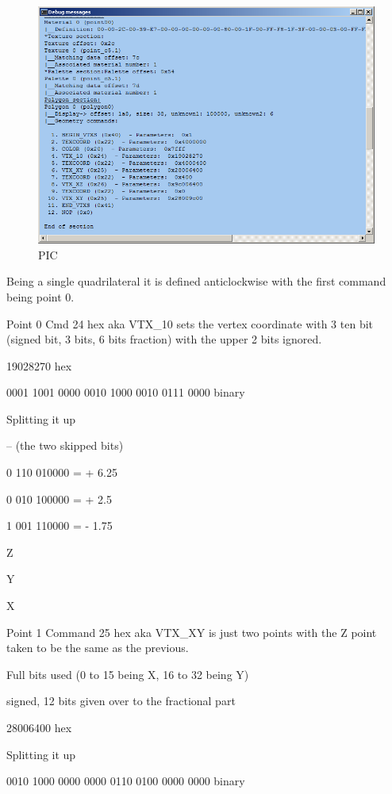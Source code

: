 \documentclass[
]{book}
\begin{document}
\begin{figure}
\centering
\includegraphics{images/63_home_fast6191_romhackingguide_unrenamed_file____romhackingguidegraphics3dminorNSMBDmodel_1.png}
\caption{PIC}
\end{figure}

Being a single quadrilateral it is defined anticlockwise with the first command being point 0.

Point 0 Cmd 24 hex aka VTX\_10 sets the vertex coordinate with 3 ten bit (signed bit, 3 bits, 6 bits fraction) with the upper 2 bits ignored.

19028270 hex

0001 1001 0000 0010 1000 0010 0111 0000 binary

Splitting it up

-- (the two skipped bits)

0 110 010000 = + 6.25

0 010 100000 = + 2.5

1 001 110000 = - 1.75

Z

Y

X

Point 1 Command 25 hex aka VTX\_XY is just two points with the Z point taken to be the same as the previous.

Full bits used (0 to 15 being X, 16 to 32 being Y)

signed, 12 bits given over to the fractional part

28006400 hex

Splitting it up

0010 1000 0000 0000 0110 0100 0000 0000 binary
\end{document}
